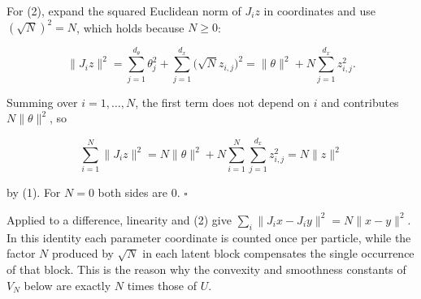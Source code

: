 \documentclass[11pt,a4paper]{article}
\begin{document}
For (2), expand the squared Euclidean norm of \(J_iz\) in coordinates and use \((\sqrt N)^2=N\), which holds because \(N\ge0\):


\[\|J_iz\|^2=\sum_{j=1}^{d_\theta}\theta_j^2+\sum_{j=1}^{d_x}\bigl(\sqrt N z_{i,j}\bigr)^2=\|\theta\|^2+N\sum_{j=1}^{d_x}z_{i,j}^2 .\]


Summing over \(i=1,\dots,N\), the first term does not depend on \(i\) and contributes \(N\|\theta\|^2\), so


\[\sum_{i=1}^N\|J_iz\|^2=N\|\theta\|^2+N\sum_{i=1}^N\sum_{j=1}^{d_x}z_{i,j}^2=N\|z\|^2\]


by (1). For \(N=0\) both sides are \(0\). \(\square\)




Applied to a difference, linearity and (2) give \(\sum_i\|J_ix-J_iy\|^2=N\|x-y\|^2\). In this identity each parameter coordinate is counted once per particle, while the factor \(N\) produced by \(\sqrt N\) in each latent block compensates the single occurrence of that block. This is the reason why the convexity and smoothness constants of \(V_N\) below are exactly \(N\) times those of \(U\).
\end{document}
